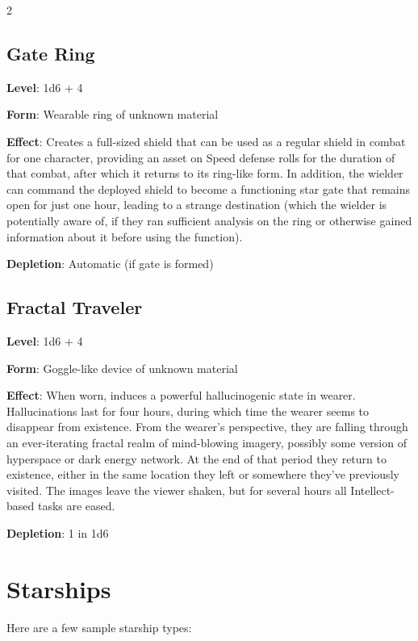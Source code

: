 \begin{multicols}{2}
\subsection{Gate Ring}

\textbf{Level}: 1d6 + 4 

\textbf{Form}: Wearable ring of unknown material 

\textbf{Effect}: Creates a full-sized shield that can be used as a regular shield in combat for one character, providing an asset on Speed defense rolls for the duration of that combat, after which it returns to its ring-like form. In addition, the wielder can command the deployed shield to become a functioning star gate that remains open for just one hour, leading to a strange destination (which the wielder is potentially aware of, if they ran sufficient analysis on the ring or otherwise gained information about it before using the function). 

\textbf{Depletion}: Automatic (if gate is formed)

\subsection{Fractal Traveler}

\textbf{Level}: 1d6 + 4 

\textbf{Form}: Goggle-like device of unknown material 

\textbf{Effect}: When worn, induces a powerful hallucinogenic state in wearer. Hallucinations last for four hours, during which time the wearer seems to disappear from existence. From the wearer’s perspective, they are falling through an ever-iterating fractal realm of mind-blowing imagery, possibly some version of hyperspace or dark energy network. At the end of that period they return to existence, either in the same location they left or somewhere they’ve previously visited. The images leave the viewer shaken, but for several hours all Intellect-based tasks are eased. 

\textbf{Depletion}: 1 in 1d6

\section{Starships}

Here are a few sample starship types:

\end{multicols}

